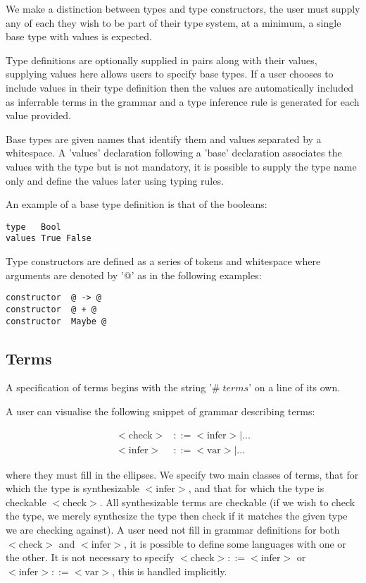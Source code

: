 We make a distinction between types and type constructors, the user
must supply any of each they wish to be part of their type system, at
a minimum, a single base type with values is expected.

Type definitions are optionally supplied in pairs along with
their values, supplying values here allows users to specify base
types. If a user chooses to include values in their type definition
then the values are automatically included as inferrable terms in the
grammar and a type inference rule is generated for each value provided.

Base types are given names that identify them and values separated by
a whitespace. A 'values' declaration following a 'base'
declaration associates the values with the type but is not mandatory,
it is possible to supply the type name only and define the values later
using typing rules.

An example of a base type definition is that of the booleans:

\begin{verbatim}
type   Bool
values True False
\end{verbatim}

Type constructors are defined as a series of tokens and whitespace
where arguments are denoted by '@' as in the following examples:

\begin{verbatim}
constructor  @ -> @
constructor  @ + @
constructor  Maybe @
\end{verbatim}


\subsection{Terms}

A specification of terms begins with the string '$\# \; terms$' on a
line of its own.

A user can visualise the following snippet of grammar describing terms:

\begin{align*}
<\mbox{check}> &::= <\mbox{infer}> | ... \\
<\mbox{infer}> &::= <\mbox{var}> | ...
\end{align*}

where they must fill in the ellipses. We specify two main classes of
terms, that for which the type is synthesizable $<\mbox{infer}>$, and
that for which the type is checkable $<\mbox{check}>$. All synthesizable
terms are checkable (if we wish to check the type, we merely
synthesize the type then check if it matches the given type we are
checking against). A user need not fill in grammar definitions for
both $<\mbox{check}>$ and $<\mbox{infer}>$, it is possible to define
some languages with one or the other. It is not necessary to specify
$<\mbox{check}> ::= <\mbox{infer}>$ or
$<\mbox{infer}> ::= <\mbox{var}>$, this is handled implicitly.

